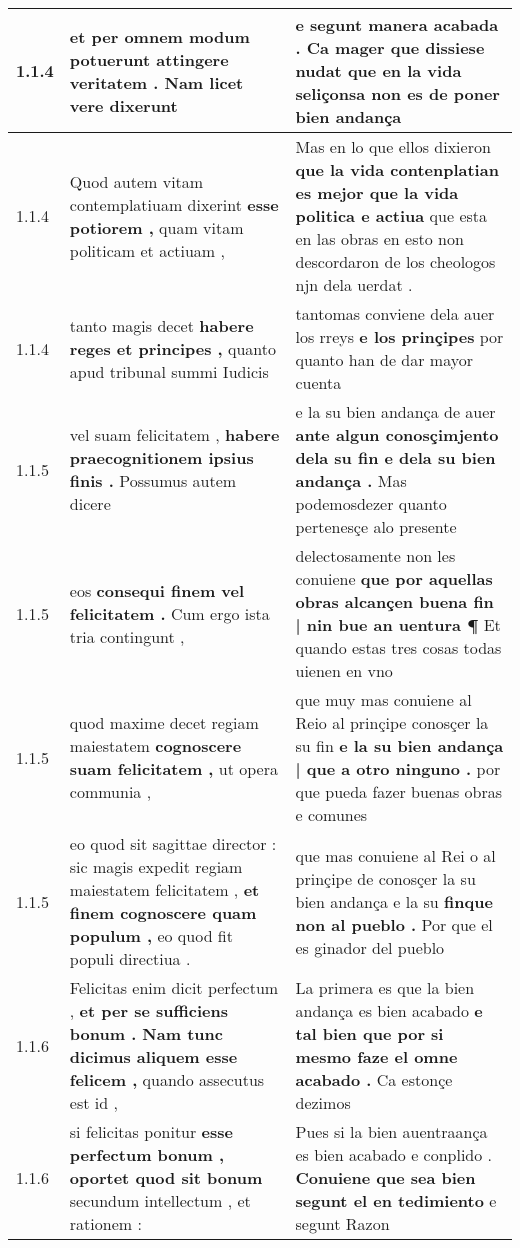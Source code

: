 \begin{tabular}{|p{1cm}|p{6.5cm}|p{6.5cm}|}
1.1.4 & et per omnem modum potuerunt \textbf{ attingere veritatem . } Nam licet vere dixerunt & e segunt manera acabada . \textbf{ Ca mager que dissiese nudat } que en la vida seliçonsa non es de poner bien andança \\\hline
1.1.4 & Quod autem vitam contemplatiuam dixerint \textbf{ esse potiorem , } quam vitam politicam et actiuam , & Mas en lo que ellos dixieron \textbf{ que la vida contenplatian es mejor que la vida politica e actiua } que esta en las obras en esto non descordaron de los cheologos njn dela uerdat . \\\hline
1.1.4 & tanto magis decet \textbf{ habere reges et principes , } quanto apud tribunal summi Iudicis & tantomas conviene dela auer los rreys \textbf{ e los prinçipes } por quanto han de dar mayor cuenta \\\hline
1.1.5 & vel suam felicitatem , \textbf{ habere praecognitionem ipsius finis . } Possumus autem dicere & e la su bien andança de auer \textbf{ ante algun conosçimjento dela su fin e dela su bien andança . } Mas podemosdezer quanto pertenesçe alo presente \\\hline
1.1.5 & eos \textbf{ consequi finem vel felicitatem . } Cum ergo ista tria contingunt , & delectosamente non les conuiene \textbf{ que por aquellas obras alcançen buena fin | nin bue an uentura ¶ } Et quando estas tres cosas todas uienen en vno \\\hline
1.1.5 & quod maxime decet regiam maiestatem \textbf{ cognoscere suam felicitatem , } ut opera communia , & que muy mas conuiene al Reio al prinçipe conosçer la su fin \textbf{ e la su bien andança | que a otro ninguno . } por que pueda fazer buenas obras e comunes \\\hline
1.1.5 & eo quod sit sagittae director : sic magis expedit regiam maiestatem felicitatem , \textbf{ et finem cognoscere quam populum , } eo quod fit populi directiua . & que mas conuiene al Rei o al prinçipe de conosçer la su bien andança e la su \textbf{ finque non al pueblo . } Por que el es ginador del pueblo \\\hline
1.1.6 & Felicitas enim dicit perfectum , \textbf{ et per se sufficiens bonum . Nam tunc dicimus aliquem esse felicem , } quando assecutus est id , & La primera es que la bien andança es bien acabado \textbf{ e tal bien que por si mesmo faze el omne acabado . } Ca estonçe dezimos \\\hline
1.1.6 & si felicitas ponitur \textbf{ esse perfectum bonum , oportet quod sit bonum } secundum intellectum , et rationem : & Pues si la bien auentraança es bien acabado e conplido . \textbf{ Conuiene que sea bien segunt el en tedimiento } e segunt Razon \\\hline

\end{tabular}
